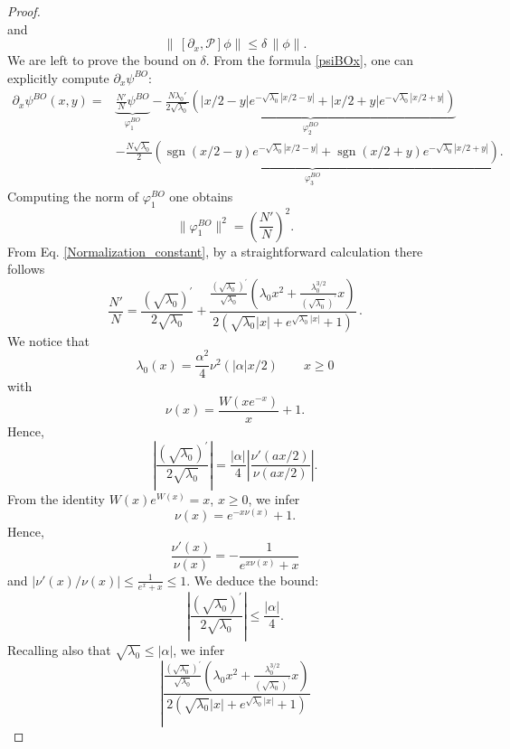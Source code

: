 \documentclass[a4paper,11pt,reqno]{amsart}
\theoremstyle{definition}
\numberwithin{equation}{section}
\DeclareMathOperator{\sgn}{sgn}
\newcommand{\NN}{N}
\newcommand{\PP}{\mathcal P}
\begin{document}
\begin{proof}
\[    \]
    and   
    \[
    \|\,[\partial_x, \PP]\phi\|  
     \leq \delta\, \|\phi\|. 
    \]   
We are left to prove the bound on $\delta$.
    From the formula \eqref{psiBOx}, one can explicitly compute $\partial_x\psi^{BO}$:
\[
\begin{aligned}
\partial_x \psi^{BO}(x,y) =&
\underbrace{\frac{\NN'}{\NN} \psi^{BO}}_{\varphi^{BO}_1}
-
\underbrace{\frac{{\NN}\lambda_0'}{2\sqrt{\lambda_0}}  
\left(|x/2-y|e^{-\sqrt{\lambda_0}|x/2-y|} +|x/2+y|e^{-\sqrt{\lambda_0}|x/2+y|}\right)}_{\varphi^{BO}_2} 
\\
&-\underbrace{\frac{{\NN} \sqrt{\lambda_0}}{2} 
\left(\sgn(x/2-y)e^{-\sqrt{\lambda_0}|x/2-y|} + \sgn(x/2+y)e^{-\sqrt{\lambda_0}|x/2+y|}\right)}_{\varphi^{BO}_3}. 
\end{aligned}
\]
Computing the norm of $\varphi^{BO}_1$ one obtains
\[
\|\varphi^{BO}_1\|^{2} =\left( \frac{\NN'}{\NN}\right)^2.
\]
From Eq. \eqref{Normalization_constant}, by a straightforward calculation there follows 
    \begin{equation*}
            \frac{\NN'}{\NN} = \frac{(\sqrt{\lambda_0})^{\prime}}{2\sqrt{\lambda_0}} + \frac{\frac{(\sqrt{\lambda_0})^{\prime}}{\sqrt{\lambda_0}} \left(\lambda_0 x^2 + \frac{\lambda_0^{3/2}}{(\sqrt{\lambda_0})^{\prime}}x\right)}{2 \left(  \sqrt{\lambda_0}|x|+e^{\sqrt{\lambda_0}|x|}+1\right)} \, .
    \end{equation*}
We notice that 
\[
\lambda_0(x) = \frac{\alpha^2}{4} \nu^2(|\alpha| x/ 2) \qquad x\geq 0
\]
with 
\[
\nu(x) = \frac{W(xe^{-x})}{x}+1.
\]
Hence, 
\begin{equation*}%
    \left\lvert\frac{(\sqrt{\lambda_0})^{\prime}}{2\sqrt{\lambda_0}} \right\rvert = \frac{|\alpha|}{4}  \left|\frac{\nu'(ax/2)}{\nu(ax/2)}\right|.  
\end{equation*}
From the identity $W(x)e^{W(x)} = x$, $x\geq 0$, we infer 
\[
\nu(x) = e^{-x\nu(x)}+1.
\]
Hence, 
\[
\frac{\nu'(x)}{\nu(x)} = - \frac{1}{e^{x\nu(x)}+x}
\]
and $|\nu'(x)/\nu(x)| \leq \frac{1}{e^{x}+x} \leq 1$. We deduce the bound:  
\begin{equation} \label{sqrtlambdaprime}
    \left| \frac{(\sqrt{\lambda_0})^{\prime}}{2\sqrt{\lambda_0}} \right| \leq \frac{|\alpha|}{4}.
\end{equation}
Recalling also that $\sqrt{\lambda_0} \leq |\alpha|$, we infer
    \begin{equation*}%
 \left|\frac{\frac{(\sqrt{\lambda_0})^{\prime}}{\sqrt{\lambda_0}} \left(\lambda_0 x^2 + \frac{\lambda_0^{3/2}}{(\sqrt{\lambda_0})^{\prime}}x\right)}{2 \left(  \sqrt{\lambda_0}|x|+e^{\sqrt{\lambda_0}|x|}+1\right)} 

\end{equation*}
\end{proof}
\end{document}
